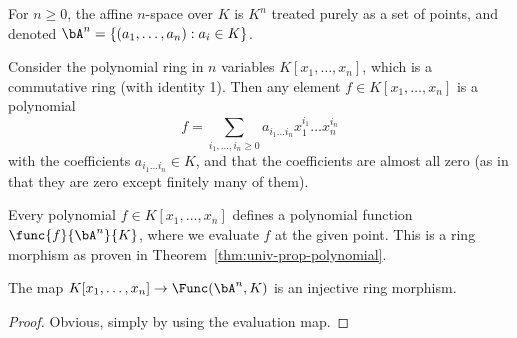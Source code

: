 \begin{definition}
    For \(n \geq 0\), the affine \(n\)-space over \(K\)
    is \(K^n\) treated purely as a set of points,
    and denoted \(\bA^n = \{(a_1,\hdots,a_n): a_i \in K\}\).
\end{definition}
\begin{definition}
    Consider the polynomial ring in \(n\) variables \(K[x_1,\hdots,x_n]\),
    which is a commutative ring (with identity 1).
    Then any element \(f \in K[x_1,\hdots,x_n]\) is a polynomial
    \begin{equation*}
        f = \sum_{i_1,\hdots,i_n \geq 0} a_{i_1 \hdots i_n} x_1^{i_1} \hdots x_n^{i_n}
    \end{equation*}
    with the coefficients \(a_{i_1 \hdots i_n} \in K\),
    and that the coefficients are almost all zero
    (as in that they are zero except finitely many of them).
\end{definition}
\begin{definition}
    Every polynomial \(f \in K[x_1,\hdots,x_n]\)
    defines a polynomial function \(\func{f}{\bA^n}{K}\),
    where we evaluate \(f\) at the given point.
    This is a ring morphism as proven in Theorem~\ref{thm:univ-prop-polynomial}.
\end{definition}
\begin{lemma}
    The map \(K[x_1,\hdots,x_n] \to \Func(\bA^n,K)\) is an injective ring morphism.
\end{lemma}
\begin{proof}
    Obvious, simply by using the evaluation map.
\end{proof}

